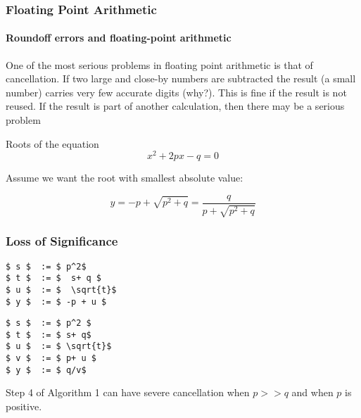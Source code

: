\documentclass[10pt]{beamer}
\begin{document}
\begin{frame}
\frametitle{Floating Point Arithmetic}
\framesubtitle{Roundoff errors and floating-point arithmetic} 

\begin{alertblock}{}
One of the most serious problems in floating point arithmetic
is that of cancellation. 
If two large and
close-by numbers are subtracted the result (a small number)
carries very few accurate digits (why?). This is fine if the 
result is not reused. If the result is part of another 
calculation, then  there may be a serious problem
\end{alertblock}

\begin{example}
 Roots of the equation
\[
x^2 + 2 p x - q = 0
\] 

Assume we want the root with smallest absolute value:

\[  y = -p + \sqrt{p^2 + q} = \frac{ q }{  p + \sqrt{p^2 + q}} \]
\end{example}


\end{frame}
\begin{frame}[fragile]
\frametitle{Loss of Significance}
\begin{minipage}[t]{4.2in} 
\begin{lstlisting}[mathescape,caption=alg 1]
$ s $  := $ p^2$       
$ t $  := $  s+ q $    
$ u $  := $  \sqrt{t}$
$ y $  := $ -p + u $ 
\end{lstlisting}
\end{minipage} 
\begin{minipage}[t]{4.2in} 
\begin{lstlisting}[mathescape,caption=alg 2]
$ s $  := $ p^2 $
$ t $  := $ s+ q$
$ u $  := $ \sqrt{t}$
$ v $  := $ p+ u $
$ y $  := $ q/v$
\end{lstlisting}
\end{minipage} 

Step 4 of Algorithm 1 can have severe cancellation when 
$p >> q$ and when $p$ is positive. 
\end{frame}
\end{document}
